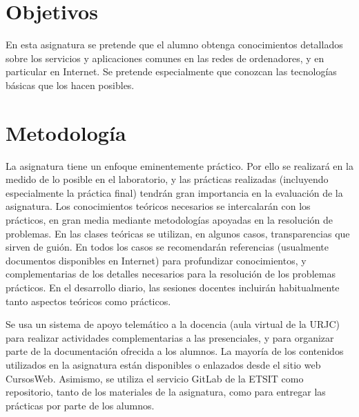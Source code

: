 \documentclass[a4paper,12pt]{article}
\begin{document}
\newpage

\section{Objetivos}

En esta asignatura se pretende que el alumno obtenga conocimientos detallados sobre los servicios y aplicaciones comunes en las redes de ordenadores, y en particular en Internet. Se pretende especialmente que conozcan las tecnologías básicas que los hacen posibles.

\section{Metodología}

La asignatura tiene un enfoque eminentemente práctico. Por ello se realizará en la medido de lo posible en el laboratorio, y las prácticas realizadas (incluyendo especialmente la práctica final) tendrán gran importancia en la evaluación de la asignatura. Los conocimientos teóricos necesarios se intercalarán con los prácticos, en gran media mediante metodologías apoyadas en la resolución de problemas. En las clases teóricas se utilizan, en algunos casos, transparencias que sirven de guión. En todos los casos se recomendarán referencias (usualmente documentos disponibles en Internet) para profundizar conocimientos, y complementarias de los detalles necesarios para la resolución de los problemas prácticos. En el desarrollo diario, las sesiones docentes incluirán habitualmente tanto aspectos teóricos como prácticos.

Se usa un sistema de apoyo telemático a la docencia (aula virtual de la URJC) para realizar actividades complementarias a las presenciales, y para organizar parte de la documentación ofrecida a los alumnos. La mayoría de los contenidos utilizados en la asignatura están disponibles o enlazados desde el sitio web CursosWeb. Asimismo, se utiliza el servicio GitLab de la ETSIT como repositorio, tanto de los materiales de la asignatura, como para entregar las prácticas por parte de los alumnos.

\newpage

\end{document}

